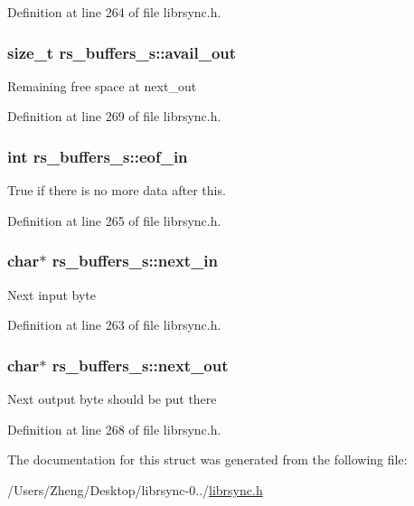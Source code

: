 Definition at line 264 of file librsync.\+h.

\hypertarget{structrs__buffers__s_ae60f3db2f518d74aee13a02b7c9619a2}{}
\subsubsection[{avail\+\_\+out}]{\setlength{\rightskip}{0pt plus 5cm}size\+\_\+t rs\+\_\+buffers\+\_\+s\+::avail\+\_\+out}\label{structrs__buffers__s_ae60f3db2f518d74aee13a02b7c9619a2}
Remaining free space at next\+\_\+out 

Definition at line 269 of file librsync.\+h.

\hypertarget{structrs__buffers__s_aa6783da2d894c77178155759cd12d16f}{}
\subsubsection[{eof\+\_\+in}]{\setlength{\rightskip}{0pt plus 5cm}int rs\+\_\+buffers\+\_\+s\+::eof\+\_\+in}\label{structrs__buffers__s_aa6783da2d894c77178155759cd12d16f}
True if there is no more data after this. 

Definition at line 265 of file librsync.\+h.

\hypertarget{structrs__buffers__s_a6d5d12a1ced9a3a8891259e09c80ec20}{}
\subsubsection[{next\+\_\+in}]{\setlength{\rightskip}{0pt plus 5cm}char$\ast$ rs\+\_\+buffers\+\_\+s\+::next\+\_\+in}\label{structrs__buffers__s_a6d5d12a1ced9a3a8891259e09c80ec20}
Next input byte 

Definition at line 263 of file librsync.\+h.

\hypertarget{structrs__buffers__s_af3a6532c3e300a07783d61680cbdc11f}{}
\subsubsection[{next\+\_\+out}]{\setlength{\rightskip}{0pt plus 5cm}char$\ast$ rs\+\_\+buffers\+\_\+s\+::next\+\_\+out}\label{structrs__buffers__s_af3a6532c3e300a07783d61680cbdc11f}
Next output byte should be put there 

Definition at line 268 of file librsync.\+h.



The documentation for this struct was generated from the following file\+:\begin{DoxyCompactItemize}
\item 
/\+Users/\+Zheng/\+Desktop/librsync-\/0../\hyperlink{librsync_8h}{librsync.\+h}\end{DoxyCompactItemize}
